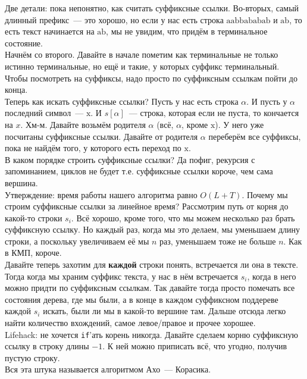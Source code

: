 \documentclass{article}
\begin{document}
    Две детали: пока непонятно, как считать суффиксные ссылки. Во-вторых, самый длинный префикс~--- это хорошо, но если у нас есть строка $\mathrm{aabbababab}$ и $\mathrm{ab}$, то есть текст начинается на $\mathrm{ab}$, мы не увидим, что придём в терминальное состояние.\\
    Начнём со второго. Давайте в начале пометим как терминальные не только истинно терминальные, но ещё и такие, у которых суффикс терминальный. Чтобы посмотреть на суффиксы, надо просто по суффиксным ссылкам пойти до конца.\\
    Теперь как искать суффиксные ссылки? Пусть у нас есть строка $\alpha$. И пусть у $\alpha$ последний символ~--- $\mathrm x$. И $s[\alpha]$~--- строка, которая если не пуста, то кончается на $x$. Хм-м. Давайте возьмём родителя $\alpha$ (всё, $\alpha$, кроме $\mathrm x$). У него уже посчитаны суффиксные ссылки. Давайте от родителя $\alpha$ переберём все суффиксы, пока не найдём того, у которого есть переход по $\mathrm x$.\\
    В каком порядке строить суффиксные ссылки? Да пофиг, рекурсия с запоминанием, циклов не будет т.е. суффиксные ссылки короче, чем сама вершина.\\
    Утверждение: время работы нашего алгоритма равно $O(L+T)$. Почему мы строим суффиксные ссылки за линейное время? Рассмотрим путь от корня до какой-то строки $s_i$. Всё хорошо, кроме того, что мы можем несколько раз брать суффиксную ссылку. Но каждый раз, когда мы это делаем, мы уменьшаем длину строки, а поскольку увеличиваем её мы $n$ раз, уменьшаем тоже не больше $n$. Как в КМП, короче.\\
    Давайте теперь захотим для \textbf{каждой} строки понять, встречается ли она в тексте. Тогда когда мы храним суффикс текста, у нас в нём встречается $s_i$, когда в него можно придти по суффиксным ссылкам. Так давайте тогда просто помечать все состояния дерева, где мы были, а в конце в каждом суффиксном поддереве каждой $s_i$ искать, были ли мы в какой-то вершине там. Дальше отсюда легко найти количество вхождений, самое левое/правое и прочее хорошее.\\
    Lifehack: не хочется \texttt{if}'ать корень никогда. Давайте сделаем корню суффиксную ссылку в строку длины $-1$. К ней можно приписать всё, что угодно, получив пустую строку.\\
    Вся эта штука называется алгоритмом Ахо~--- Корасика.
\end{document}
